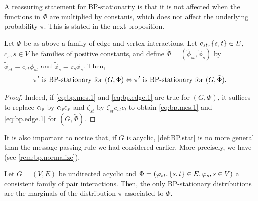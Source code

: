 A reassuring statement for BP-stationarity is that it
is not affected when the functions in $\Phi$ are multiplied by
constants, which does not affect the underlying probability $\pi$. This is stated in the next proposition.
\begin{proposition}
\label{prop:bp.ok}
Let $\Phi$ be as above a family of edge and vertex interactions. 
Let $c_{st}, \left\{ s,t \right\}\in E$, $c_s, s\in V$ be  families of positive constants, and
define $\tilde \Phi = (\tilde \phi_{st}, \tilde \phi_s)$ by $\tilde
\phi_{st} = c_{st}\phi_{st}$ and $\tilde \phi_s = c_s\phi_s$. Then,
\[
\pi' \text{ is  BP-stationary for } (G,\Phi) \\
\Leftrightarrow \pi' \text{ is
 BP-stationary for } (G,\tilde \Phi).
\]
\end{proposition}
\begin{proof}
Indeed, if \cref{eq:bp.mes.1} and \cref{eq:bp.edge.1} are true for
$(G, \Phi)$, it suffices to replace $\alpha_s$ by $\alpha_s c_s$ and $\zeta_{st}$
by $\zeta_{st}c_{st} c_t$ to obtain \cref{eq:bp.mes.1} and \cref{eq:bp.edge.1} for
$(G, \tilde\Phi)$.  
\end{proof}

It is also important to
notice that, if $G$ is acyclic,  \cref{def:BP.stat} is no
more general than the message-passing rule we had considered
earlier. More precisely, we have (see \cref{rem:bp.normalize}),
\begin{proposition}
\label{prop:bp.tree}
Let $G=(V, E)$ be undirected acyclic and  $\Phi = (\varphi_{st},
\left\{ s,t \right\}\in E, \varphi_s, s\in V)$ a consistent family of pair
interactions. Then, the only BP-stationary distributions are the
marginals of the distribution $\pi$ associated to $\Phi$. 
\end{proposition}

% 
%



